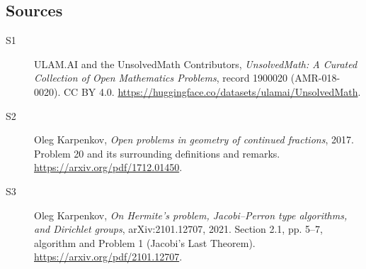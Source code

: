 \documentclass[11pt]{book}
\begin{document}
\subsection{Sources}
\begin{description}
\item[\hypertarget{source:1900020:1}{S1}] ULAM.AI and the UnsolvedMath Contributors, \emph{UnsolvedMath: A Curated Collection of Open Mathematics Problems}, record 1900020 (AMR-018-0020). CC BY 4.0. \url{https://huggingface.co/datasets/ulamai/UnsolvedMath}.
\item[\hypertarget{source:1900020:2}{S2}] Oleg Karpenkov, \emph{Open problems in geometry of continued fractions}, 2017. Problem 20 and its surrounding definitions and remarks. \url{https://arxiv.org/pdf/1712.01450}.
\item[\hypertarget{source:1900020:3}{S3}] Oleg Karpenkov, \emph{On Hermite's problem, Jacobi--Perron type algorithms, and Dirichlet groups}, arXiv:2101.12707, 2021. Section 2.1, pp. 5--7, algorithm and Problem 1 (Jacobi's Last Theorem). \url{https://arxiv.org/pdf/2101.12707}.
\end{description}
\label{end:1900020}
\end{document}
